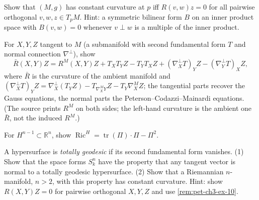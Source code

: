 \begin{remark}
  \label{rem:pet-ch3-ex-10}


  Show that $(M,g)$ has constant curvature at $p$ iff $R(v,w)z=0$ for all pairwise
  orthogonal $v,w,z\in T_pM$. Hint: a symmetric bilinear form $B$ on an inner
  product space with $B(v,w)=0$ whenever $v\perp w$ is a multiple of the inner
  product.
\end{remark}

\begin{remark}
  \label{rem:pet-ch3-ex-11}


  For $X,Y,Z$ tangent to $M$ (a submanifold with second fundamental form $T$ and
  normal connection $\nabla^\perp$), show
  \[
    \bar R(X,Y)Z=R^M(X,Y)Z+T_XT_YZ-T_YT_XZ+(\nabla^\perp_XT)_YZ-(\nabla^\perp_YT)_XZ,
  \]
  where $\bar R$ is the curvature of the ambient manifold and
  $(\nabla^\perp_XT)_YZ=\nabla^\perp_X(T_YZ)-T_{\nabla^M_XY}Z-T_Y\nabla^M_XZ$;
  the tangential parts recover the Gauss equations, the normal parts the
  Peterson--Codazzi--Mainardi equations. (The source prints $R^M$ on both sides;
  the left-hand curvature is the ambient one $\bar R$, not the induced $R^M$.)
\end{remark}

\begin{remark}
  \label{rem:pet-ch3-ex-12}


  For $H^{n-1}\subset\mathbb R^n$, show
  $\operatorname{Ric}^H=\operatorname{tr}(\Pi)\cdot\Pi-\Pi^2$.
\end{remark}

\begin{remark}
  \label{rem:pet-ch3-ex-13}


  A hypersurface is \emph{totally geodesic} if its second fundamental form
  vanishes. (1) Show that the space forms $S^n_k$ have the property that any
  tangent vector is normal to a totally geodesic hypersurface. (2) Show that a
  Riemannian $n$-manifold, $n>2$, with this property has constant curvature.
  Hint: show $R(X,Y)Z=0$ for pairwise orthogonal $X,Y,Z$ and use
  \cref{rem:pet-ch3-ex-10}.
\end{remark}


